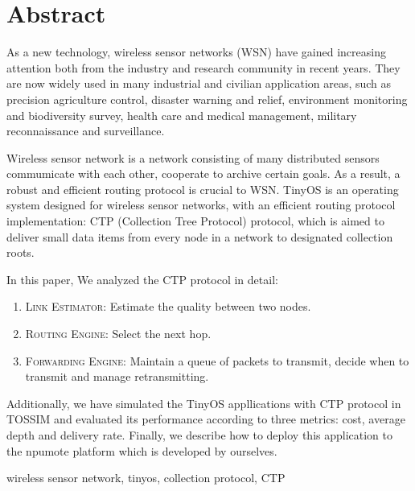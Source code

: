 ﻿%
%
%

%
%
\renewcommand{\baselinestretch}{1.5}
\fontsize{12pt}{13pt}\selectfont

\chapter[ABSTRACT（英文摘要）]{\textsf{\textbf{Abstract}}}
\noindent As a new technology, wireless sensor networks (WSN) have gained increasing attention both from  the industry and research community in recent years.
They are now widely used in many industrial and civilian application areas, such as precision agriculture control, disaster warning and relief, environment monitoring and biodiversity survey, health care and medical management, military reconnaissance and surveillance.

Wireless sensor network is a network consisting of many distributed sensors commumicate with each other, cooperate to archive certain goals. As a result, a robust and efficient routing protocol is crucial to WSN. TinyOS is an operating system designed for wireless sensor networks, with an efficient routing protocol implementation: CTP (Collection Tree Protocol) protocol, which is aimed to deliver small data items from every node in a network to designated collection roots.

In this paper, We analyzed the CTP protocol in detail:
\vspace{-12pt}
\begin{enumerate} \setlength{\itemsep}{0pt}
	\item \textsc{Link Estimator: } Estimate the quality between two nodes.
	\item \textsc{Routing Engine: } Select the next hop.
	\item \textsc{Forwarding Engine: } Maintain a queue of packets to transmit, decide when to transmit and manage retransmitting.
\end{enumerate}
\vspace{-12pt}
Additionally, we have simulated the TinyOS appllications with CTP protocol in TOSSIM and evaluated its performance according to three metrics: cost, average depth and delivery rate. Finally, we describe how to deploy this application to the npumote platform which is developed by ourselves.

\vspace{1em}
 \quad wireless sensor network, tinyos, collection protocol, CTP
